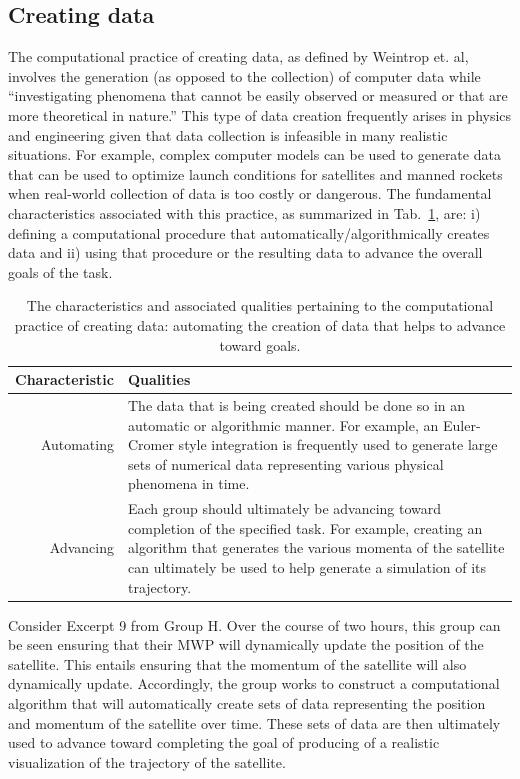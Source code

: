\documentclass{msuphddissertation}
\begin{document}
\begin{doublespace}
\subsection{Creating data}\label{CH5:SecCreatingData}

The computational practice of creating data, as defined by Weintrop et. al, involves the generation (as opposed to the collection) of computer data while ``investigating phenomena that cannot be easily observed or measured or that are more theoretical in nature.''  This type of data creation frequently arises in physics and engineering given that data collection is infeasible in many realistic situations.  For example, complex computer models can be used to generate data that can be used to optimize launch conditions for satellites and manned rockets when real-world collection of data is too costly or dangerous.  The fundamental characteristics associated with this practice, as summarized in Tab.~\ref{CH5:CreatingData}, are: i) defining a computational procedure that automatically/algorithmically creates data and ii) using that procedure or the resulting data to advance the overall goals of the task.

\begin{table}[t]
\begin{tabular}{r|p{}}
Characteristic & Qualities \\\hline\hline
Automating & The data that is being created should be done so in an automatic or algorithmic manner.  For example, an Euler-Cromer style integration is frequently used to generate large sets of numerical data representing various physical phenomena in time.\\
Advancing & Each group should ultimately be advancing toward completion of the specified task.  For example, creating an algorithm that generates the various momenta of the satellite can ultimately be used to help generate a simulation of its trajectory.\\
\end{tabular}\caption{The characteristics and associated qualities pertaining to the computational practice of creating data: automating the creation of data that helps to advance toward goals.}\label{CH5:CreatingData}
\end{table}

Consider Excerpt 9 from Group H.  Over the course of two hours, this group can be seen ensuring that their MWP will dynamically update the position of the satellite.  This entails ensuring that the momentum of the satellite will also dynamically update.  Accordingly, the group works to construct a computational algorithm that will automatically create sets of data representing the position and momentum of the satellite over time.  These sets of data are then ultimately used to advance toward completing the goal of producing of a realistic visualization of the trajectory of the satellite.


\end{doublespace}
\end{document}
